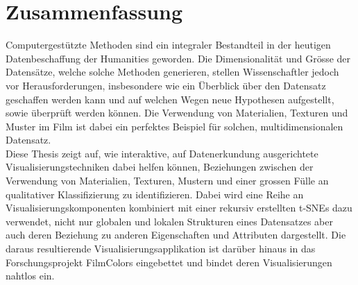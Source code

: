 
\chapter{Zusammenfassung} \label{chp:abstract_german}

Computergestützte Methoden sind ein integraler Bestandteil in der heutigen Datenbeschaffung der Humanities geworden. Die Dimensionalität und Grösse der Datensätze, welche solche Methoden generieren, stellen Wissenschaftler jedoch vor Herausforderungen, insbesondere wie ein Überblick über den Datensatz geschaffen werden kann und auf welchen Wegen neue Hypothesen aufgestellt, sowie überprüft werden können. Die Verwendung von Materialien, Texturen und Muster im Film ist dabei ein perfektes Beispiel für solchen, multidimensionalen Datensatz. \\
Diese Thesis zeigt auf, wie interaktive, auf Datenerkundung ausgerichtete Visualisierungstechniken dabei helfen können, Beziehungen zwischen der Verwendung von Materialien, Texturen, Mustern und einer grossen Fülle an qualitativer Klassifizierung zu identifizieren. 
Dabei wird eine Reihe an Visualisierungskomponenten kombiniert mit einer rekursiv erstellten t-SNEs dazu verwendet, nicht nur globalen und lokalen Strukturen eines Datensatzes aber auch deren Beziehung zu anderen Eigenschaften und Attributen dargestellt. Die daraus resultierende Visualisierungsapplikation ist darüber hinaus in das Forschungsprojekt FilmColors eingebettet und bindet deren Visualisierungen nahtlos ein.



